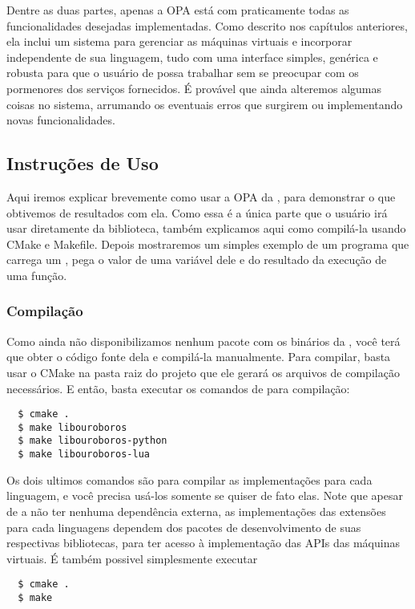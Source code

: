 Dentre as duas partes, apenas a OPA está com praticamente todas as
funcionalidades desejadas implementadas. Como descrito nos capítulos
anteriores, ela inclui um sistema para gerenciar as máquinas virtuais
e incorporar  independente de sua linguagem, tudo com uma
interface simples, genérica e robusta para que o usuário de \CXX{} possa
trabalhar sem se preocupar com os pormenores dos serviços fornecidos. É
provável que ainda alteremos algumas coisas no sistema, arrumando os
eventuais erros que surgirem ou implementando novas funcionalidades.

\subsection{Instruções de Uso}
Aqui iremos explicar brevemente como usar a OPA da ,
para demonstrar o que obtivemos de resultados com ela. Como
essa é a única parte que o usuário irá usar diretamente da biblioteca, também
explicamos aqui como compilá-la usando CMake e Makefile. Depois mostraremos
um simples exemplo de um programa que carrega um \script{}, pega o valor de uma
variável dele e do resultado da execução de uma função.

\subsubsection{Compilação} 
Como ainda não disponibilizamos nenhum pacote
com os binários da , você terá que obter o código fonte dela
e compilá-la manualmente. Para compilar, basta usar o CMake na pasta 
raiz do projeto que ele gerará os arquivos de compilação necessários.
E então, basta executar os comandos de  para compilação:

\begin{verbatim}
  $ cmake .
  $ make libouroboros
  $ make libouroboros-python
  $ make libouroboros-lua
\end{verbatim}

Os dois ultimos comandos são para compilar as implementações para cada linguagem,
e você precisa usá-los somente se quiser de fato elas. Note que apesar de a
 não ter nenhuma dependência externa, as implementações
das extensões para cada linguagens dependem dos pacotes de desenvolvimento de suas
respectivas bibliotecas, para ter acesso à implementação das APIs das máquinas virtuais.
É também possivel simplesmente executar

\begin{verbatim}
  $ cmake .
  $ make
\end{verbatim}

